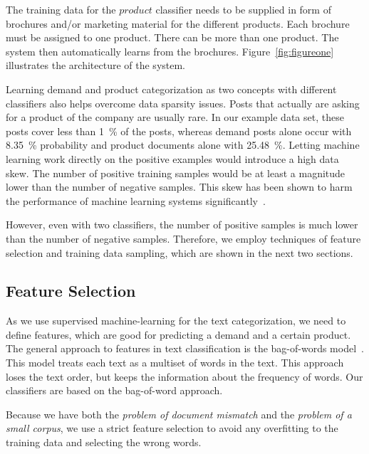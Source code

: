 The training data for the $product$ classifier needs to be supplied in form of brochures and/or marketing material for the different products.
Each brochure must be assigned to one product.
There can be more than one product.
The system then automatically learns from the brochures.
Figure~\ref{fig:figureone} illustrates the architecture of the system.

Learning demand and product categorization as two concepts with different classifiers also helps overcome data sparsity issues.
Posts that actually are asking for a product of the company are usually rare.
In our example data set, these posts cover less than 1~\% of the posts, whereas demand posts alone occur with 8.35~\% probability and product documents alone with 25.48~\%.
Letting machine learning work directly on the positive examples would introduce a high data skew.
The number of positive training samples would be at least a magnitude lower than the number of negative samples.
This skew has been shown to harm the performance of machine learning systems significantly~\cite{guo2008class,monard2002learning}.

However, even with two classifiers, the number of positive samples is much lower than the number of negative samples.
Therefore, we employ techniques of feature selection and training data sampling, which are shown in the next two sections.

\subsection{Feature Selection}
\label{sub:feature-selection}
As we use supervised machine-learning for the text categorization, we need to define features, which are good for predicting a demand and a certain product.
The general approach to features in text classification is the bag-of-words model~\cite{yang1997comparative,zhang2010understanding}.
This model treats each text as a multiset of words in the text.
This approach loses the text order, but keeps the information about the frequency of words.
Our classifiers are based on the bag-of-word approach.

Because we have both the \emph{problem of document mismatch} and the \emph{problem of a small corpus}, we use a strict feature selection to avoid any overfitting to the training data and selecting the wrong words.

